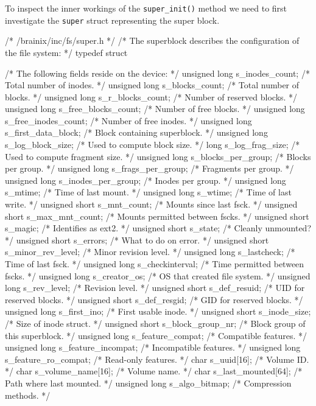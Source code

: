 To inspect the inner workings of the \verb|super_init()| method we need to first investigate the \verb|super| struct representing the super block.
\begin{code}[numbers=left,firstnumber=35]
/* /brainix/inc/fs/super.h */
 /* The superblock describes the configuration of the file system: */
 typedef struct
 {
      /* The following fields reside on the device: */
      unsigned long s_inodes_count;      /* Total number of inodes.         */
      unsigned long s_blocks_count;      /* Total number of blocks.         */
      unsigned long s_r_blocks_count;    /* Number of reserved blocks.      */
      unsigned long s_free_blocks_count; /* Number of free blocks.          */
      unsigned long s_free_inodes_count; /* Number of free inodes.          */
      unsigned long s_first_data_block;  /* Block containing superblock.    */
      unsigned long s_log_block_size;    /* Used to compute block size.     */
      long s_log_frag_size;              /* Used to compute fragment size.  */
      unsigned long s_blocks_per_group;  /* Blocks per group.               */
      unsigned long s_frags_per_group;   /* Fragments per group.            */
      unsigned long s_inodes_per_group;  /* Inodes per group.               */
      unsigned long s_mtime;             /* Time of last mount.             */
      unsigned long s_wtime;             /* Time of last write.             */
      unsigned short s_mnt_count;        /* Mounts since last fsck.         */
      unsigned short s_max_mnt_count;    /* Mounts permitted between fscks. */
      unsigned short s_magic;            /* Identifies as ext2.             */
      unsigned short s_state;            /* Cleanly unmounted?              */
      unsigned short s_errors;           /* What to do on error.            */
      unsigned short s_minor_rev_level;  /* Minor revision level.           */
      unsigned long s_lastcheck;         /* Time of last fsck.              */
      unsigned long s_checkinterval;     /* Time permitted between fscks.   */
      unsigned long s_creator_os;        /* OS that created file system.    */
      unsigned long s_rev_level;         /* Revision level.                 */
      unsigned short s_def_resuid;       /* UID for reserved blocks.        */
      unsigned short s_def_resgid;       /* GID for reserved blocks.        */
      unsigned long s_first_ino;         /* First usable inode.             */
      unsigned short s_inode_size;       /* Size of inode struct.           */
      unsigned short s_block_group_nr;   /* Block group of this superblock. */
      unsigned long s_feature_compat;    /* Compatible features.            */
      unsigned long s_feature_incompat;  /* Incompatible features.          */
      unsigned long s_feature_ro_compat; /* Read-only features.             */
      char s_uuid[16];                   /* Volume ID.                      */
      char s_volume_name[16];            /* Volume name.                    */
      char s_last_mounted[64];           /* Path where last mounted.        */
      unsigned long s_algo_bitmap;       /* Compression methods.            */
 
}
\end{code}
